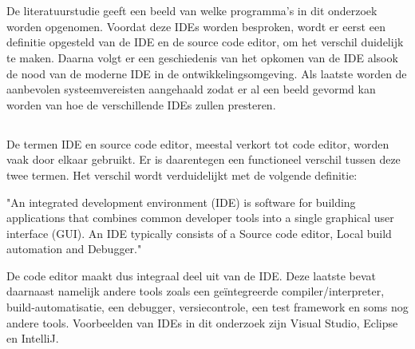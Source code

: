 \chapter{}
\label{ch:stand-van-zaken}



De literatuurstudie geeft een beeld van welke programma’s in dit onderzoek worden opgenomen. Voordat deze IDEs worden besproken, wordt er eerst een definitie opgesteld van de IDE en de source code editor, om het verschil duidelijk te maken. Daarna volgt er een geschiedenis van het opkomen van de IDE alsook de nood van de moderne IDE in de ontwikkelingsomgeving. Als laatste worden de aanbevolen systeemvereisten aangehaald zodat er al een beeld gevormd kan worden van hoe de verschillende IDEs zullen presteren.

\section{}
\label{sec:IDE-codeEditor}

De termen IDE en source code editor, meestal verkort tot code editor, worden vaak door elkaar gebruikt. Er is daarentegen een functioneel verschil tussen deze twee termen. Het verschil wordt verduidelijkt met de volgende definitie:

\begin{displayquote}
"An integrated development environment (IDE) is software for building applications that combines common developer tools into a single graphical user interface (GUI). An IDE typically consists of a Source code editor,  Local build automation and Debugger." \autocite{RedHat2018}
\end{displayquote}

De code editor maakt dus integraal deel uit van de IDE. Deze laatste bevat daarnaast namelijk andere tools zoals een geïntegreerde compiler/interpreter, build-automatisatie, een debugger, versiecontrole, een test framework en soms nog andere tools. Voorbeelden van IDEs in dit onderzoek zijn Visual Studio, Eclipse en IntelliJ.

